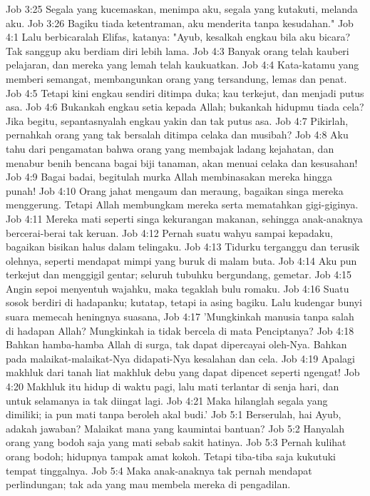 Job 3:25  Segala yang kucemaskan, menimpa aku, segala yang kutakuti, melanda aku.
Job 3:26  Bagiku tiada ketentraman, aku menderita tanpa kesudahan."
Job 4:1  Lalu berbicaralah Elifas, katanya: "Ayub, kesalkah engkau bila aku bicara? Tak sanggup aku berdiam diri lebih lama.
Job 4:3  Banyak orang telah kauberi pelajaran, dan mereka yang lemah telah kaukuatkan.
Job 4:4  Kata-katamu yang memberi semangat, membangunkan orang yang tersandung, lemas dan penat.
Job 4:5  Tetapi kini engkau sendiri ditimpa duka; kau terkejut, dan menjadi putus asa.
Job 4:6  Bukankah engkau setia kepada Allah; bukankah hidupmu tiada cela? Jika begitu, sepantasnyalah engkau yakin dan tak putus asa.
Job 4:7  Pikirlah, pernahkah orang yang tak bersalah ditimpa celaka dan musibah?
Job 4:8  Aku tahu dari pengamatan bahwa orang yang membajak ladang kejahatan, dan menabur benih bencana bagai biji tanaman, akan menuai celaka dan kesusahan!
Job 4:9  Bagai badai, begitulah murka Allah membinasakan mereka hingga punah!
Job 4:10  Orang jahat mengaum dan meraung, bagaikan singa mereka menggerung. Tetapi Allah membungkam mereka serta mematahkan gigi-giginya.
Job 4:11  Mereka mati seperti singa kekurangan makanan, sehingga anak-anaknya bercerai-berai tak keruan.
Job 4:12  Pernah suatu wahyu sampai kepadaku, bagaikan bisikan halus dalam telingaku.
Job 4:13  Tidurku terganggu dan terusik olehnya, seperti mendapat mimpi yang buruk di malam buta.
Job 4:14  Aku pun terkejut dan menggigil gentar; seluruh tubuhku bergundang, gemetar.
Job 4:15  Angin sepoi menyentuh wajahku, maka tegaklah bulu romaku.
Job 4:16  Suatu sosok berdiri di hadapanku; kutatap, tetapi ia asing bagiku. Lalu kudengar bunyi suara memecah heningnya suasana,
Job 4:17  'Mungkinkah manusia tanpa salah di hadapan Allah? Mungkinkah ia tidak bercela di mata Penciptanya?
Job 4:18  Bahkan hamba-hamba Allah di surga, tak dapat dipercayai oleh-Nya. Bahkan pada malaikat-malaikat-Nya didapati-Nya kesalahan dan cela.
Job 4:19  Apalagi makhluk dari tanah liat makhluk debu yang dapat dipencet seperti ngengat!
Job 4:20  Makhluk itu hidup di waktu pagi, lalu mati terlantar di senja hari, dan untuk selamanya ia tak diingat lagi.
Job 4:21  Maka hilanglah segala yang dimiliki; ia pun mati tanpa beroleh akal budi.'
Job 5:1  Berserulah, hai Ayub, adakah jawaban? Malaikat mana yang kaumintai bantuan?
Job 5:2  Hanyalah orang yang bodoh saja yang mati sebab sakit hatinya.
Job 5:3  Pernah kulihat orang bodoh; hidupnya tampak amat kokoh. Tetapi tiba-tiba saja kukutuki tempat tinggalnya.
Job 5:4  Maka anak-anaknya tak pernah mendapat perlindungan; tak ada yang mau membela mereka di pengadilan.
